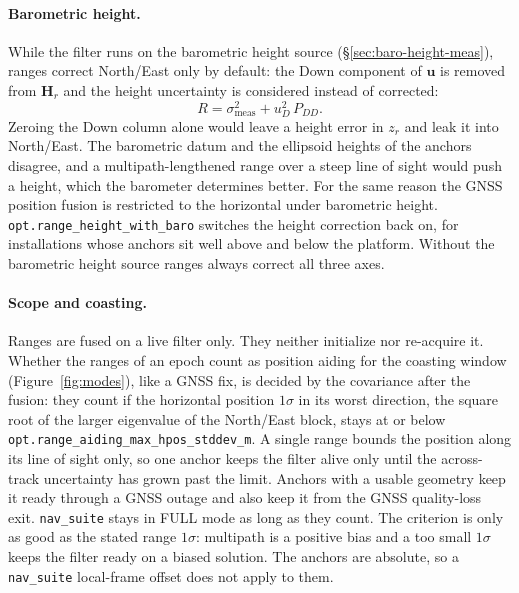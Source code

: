 \documentclass[11pt,a4paper]{article}
\newcommand{\vect}[1]{\bm{#1}}
\newcommand{\mat}[1]{\bm{#1}}
\newcommand{\code}[1]{\texttt{#1}}
\begin{document}
\paragraph{Barometric height.} While the filter runs on the barometric height
source (\S\ref{sec:baro-height-meas}), ranges correct North/East only by
default: the Down component of $\vect{u}$ is removed from $\mat{H}_r$ and the
height uncertainty is considered instead of corrected:
\begin{equation}
  R = \sigma_{\text{meas}}^2 + u_D^2\, P_{DD} .
\end{equation}
Zeroing the Down column alone would leave a height error in $z_r$ and leak it
into North/East. The barometric datum and the ellipsoid heights of the anchors
disagree, and a multipath-lengthened range over a steep line of sight would
push a height, which the barometer determines better. For the same reason the
GNSS position fusion is restricted to the horizontal under barometric height.
\code{opt.range\_\allowbreak{}height\_\allowbreak{}with\_\allowbreak{}baro}
switches the height correction back on, for installations whose anchors sit
well above and below the platform. Without the barometric height source ranges
always correct all three axes.

\paragraph{Scope and coasting.} Ranges are fused on a live filter only. They
neither initialize nor re-acquire it. Whether the ranges of an epoch count as
position aiding for the coasting window (Figure~\ref{fig:modes}), like a GNSS
fix, is decided by the covariance after the fusion: they count if the horizontal
position $1\sigma$ in its worst direction, the square root of the larger
eigenvalue of the North/East block, stays at or below
\code{opt.range\_\allowbreak{}aiding\_\allowbreak{}max\_\allowbreak{}hpos\_\allowbreak{}stddev\_\allowbreak{}m}.
A single range bounds the position along its line of sight only, so one anchor
keeps the filter alive only until the across-track uncertainty has grown past
the limit. Anchors with a usable geometry keep it ready through a GNSS
outage and also keep it from the GNSS quality-loss exit.
\code{nav\_\allowbreak{}suite} stays in FULL mode as long as they count. The
criterion is only as good as the stated range $1\sigma$: multipath is a
positive bias and a too small $1\sigma$ keeps the filter ready on a biased
solution. The anchors are absolute, so a \code{nav\_\allowbreak{}suite}
local-frame offset does not apply to them.
\end{document}
